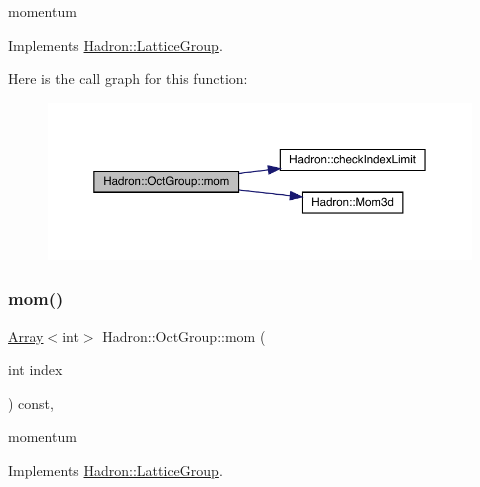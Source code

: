 momentum 

Implements \mbox{\hyperlink{structHadron_1_1LatticeGroup_ad577b65041dd9a6e84b1f3bd49cb8fce}{Hadron\+::\+Lattice\+Group}}.

Here is the call graph for this function\+:
\nopagebreak
\begin{figure}[H]
\begin{center}
\leavevmode
\includegraphics[width=350pt]{d1/de5/structHadron_1_1OctGroup_ab3c3d81d578cac614b1ccdd456f8ea59_cgraph}
\end{center}
\end{figure}
\mbox{\label{structHadron_1_1OctGroup_ab3c3d81d578cac614b1ccdd456f8ea59}} 
\subsubsection{\texorpdfstring{mom()}{mom()}\hspace{0.1cm}{\footnotesize\ttfamily [3/3]}}
{\footnotesize\ttfamily \mbox{\hyperlink{classXMLArray_1_1Array}{Array}}$<$int$>$ Hadron\+::\+Oct\+Group\+::mom (\begin{DoxyParamCaption}\item[{int}]{index }\end{DoxyParamCaption}) const\hspace{0.3cm}{\ttfamily [inline]}, {\ttfamily [virtual]}}

momentum 

Implements \mbox{\hyperlink{structHadron_1_1LatticeGroup_ad577b65041dd9a6e84b1f3bd49cb8fce}{Hadron\+::\+Lattice\+Group}}.


